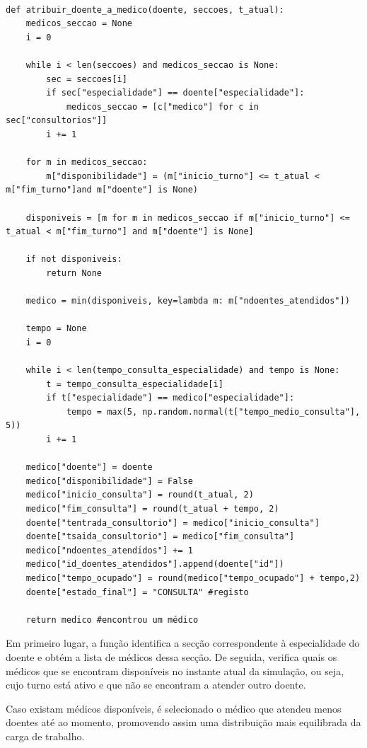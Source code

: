 \documentclass[12pt,a4paper]{article} %
\begin{document}
\hypertarget{atribuir_doente_a_medico}{}
\begin{verbatim}

def atribuir_doente_a_medico(doente, seccoes, t_atual):
    medicos_seccao = None
    i = 0

    while i < len(seccoes) and medicos_seccao is None:
        sec = seccoes[i]
        if sec["especialidade"] == doente["especialidade"]:
            medicos_seccao = [c["medico"] for c in sec["consultorios"]]
        i += 1

    for m in medicos_seccao:
        m["disponibilidade"] = (m["inicio_turno"] <= t_atual < m["fim_turno"]and m["doente"] is None)
        
    disponiveis = [m for m in medicos_seccao if m["inicio_turno"] <= t_atual < m["fim_turno"] and m["doente"] is None]

    if not disponiveis:
        return None

    medico = min(disponiveis, key=lambda m: m["ndoentes_atendidos"])

    tempo = None
    i = 0

    while i < len(tempo_consulta_especialidade) and tempo is None:
        t = tempo_consulta_especialidade[i]
        if t["especialidade"] == medico["especialidade"]:
            tempo = max(5, np.random.normal(t["tempo_medio_consulta"], 5))
        i += 1
        
    medico["doente"] = doente
    medico["disponibilidade"] = False
    medico["inicio_consulta"] = round(t_atual, 2)
    medico["fim_consulta"] = round(t_atual + tempo, 2)
    doente["tentrada_consultorio"] = medico["inicio_consulta"]
    doente["tsaida_consultorio"] = medico["fim_consulta"]
    medico["ndoentes_atendidos"] += 1
    medico["id_doentes_atendidos"].append(doente["id"])
    medico["tempo_ocupado"] = round(medico["tempo_ocupado"] + tempo,2)
    doente["estado_final"] = "CONSULTA" #registo

    return medico #encontrou um médico
\end{verbatim}

    Em primeiro lugar, a função identifica a secção correspondente à especialidade do doente e obtém a lista de médicos dessa secção. De seguida, verifica quais os médicos que se encontram disponíveis no instante atual da simulação, ou seja, cujo turno está ativo e que não se encontram a atender outro doente.

    Caso existam médicos disponíveis, é selecionado o médico que atendeu menos doentes até ao momento, promovendo assim uma distribuição mais equilibrada da carga de trabalho.
    
\end{document}
